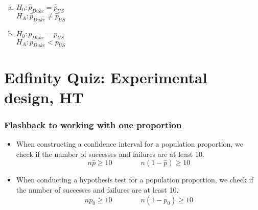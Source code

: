 \documentclass[slidestop,compress,mathserif]{beamer}
\newcommand{\soln}[1]{\textit{#1}}
\begin{document}
\begin{frame}


\begin{enumerate}[(a)]
\item $H_0:  \hat{p}_{Duke} = \hat{p}_{US}$ \\
$H_A:  \hat{p}_{Duke} \ne \hat{p}_{US}$
\item $H_0:  p_{Duke} = p_{US}$ \\
$H_A:  p_{Duke} < p_{US}$
\end{enumerate}

\soln{
}

\end{frame}

\section{Edfinity Quiz: Experimental design, HT}

\begin{frame}
\frametitle{Flashback to working with one proportion}

\begin{itemize}

\item When constructing a confidence interval for a population proportion, we check if the  number of successes and failures are at least 10.
\[ n\hat{p} \ge 10 \qquad \qquad n(1-\hat{p}) \ge 10 \]

\pause

\item When conducting a hypothesis test for a population proportion, we check if the  number of successes and failures are at least 10.
\[ np_0 \ge 10 \qquad \qquad n(1-p_0) \ge 10 \]

\end{itemize}

\end{frame}
\end{document}
